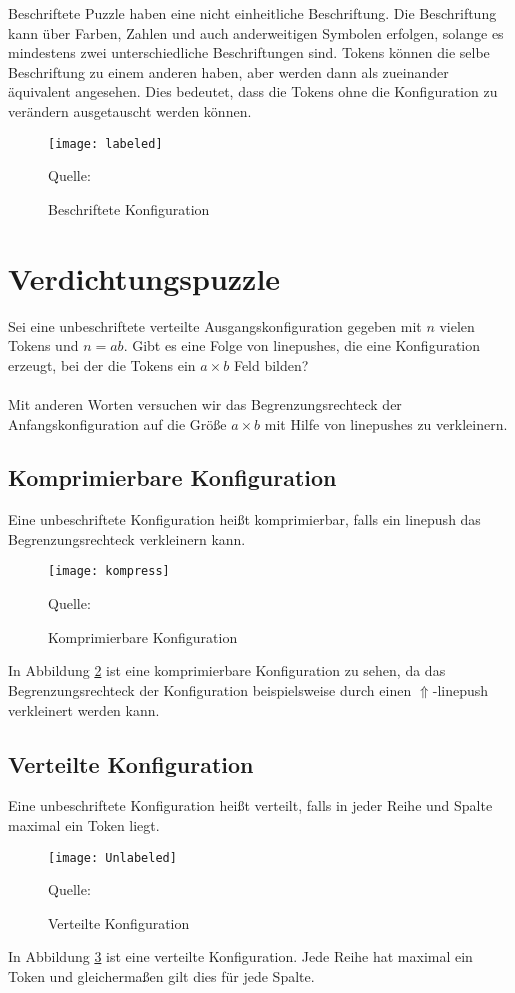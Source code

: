 \documentclass[seminar,german]{algothesis}
\newcommand*{\quelle}{%
  \footnotesize Quelle:
}
\begin{document}
\noindent
Beschriftete Puzzle haben eine nicht einheitliche Beschriftung. Die Beschriftung kann über Farben, Zahlen und auch anderweitigen Symbolen erfolgen, solange es mindestens zwei unterschiedliche Beschriftungen sind. Tokens können die selbe Beschriftung zu einem anderen haben, aber werden dann als zueinander äquivalent angesehen. Dies bedeutet, dass die Tokens ohne die Konfiguration zu verändern ausgetauscht werden können. 
\begin{figure}[ht]
	\centering
	\texttt{[image: labeled]}
	\caption{Beschriftete Konfiguration}
	\quelle \cite{akitaya2022pushing}
	\label{fig:7}
\end{figure}

\section{Verdichtungspuzzle}
Sei eine unbeschriftete verteilte Ausgangskonfiguration gegeben mit $n$ vielen Tokens und $n=ab$. Gibt es eine Folge von linepushes, die eine Konfiguration erzeugt, bei der die Tokens ein $a\times b$ Feld bilden? \\\\
Mit anderen Worten versuchen wir das Begrenzungsrechteck der Anfangskonfiguration auf die Größe $a\times b$ mit Hilfe von linepushes zu verkleinern.

\subsection{Komprimierbare Konfiguration}
\begin{definition}
Eine unbeschriftete Konfiguration heißt komprimierbar, falls ein linepush das Begrenzungsrechteck verkleinern kann.
\end{definition}
\begin{figure}[ht]
	\centering
	\texttt{[image: kompress]}
	\caption{Komprimierbare Konfiguration}
	\quelle \cite{akitaya2022pushing}
	\label{fig:8}
\end{figure}

\noindent In Abbildung \ref{fig:8} ist eine komprimierbare Konfiguration zu sehen, da das Begrenzungsrechteck der Konfiguration beispielsweise durch einen $\Uparrow$-linepush verkleinert werden kann.

\subsection{Verteilte Konfiguration}
\begin{definition}
Eine unbeschriftete Konfiguration heißt verteilt, falls in jeder Reihe und Spalte maximal ein Token liegt.
\end{definition}
\begin{figure}[ht]
	\centering
	\texttt{[image: Unlabeled]}
	\caption{Verteilte Konfiguration}
	\quelle \cite{akitaya2022pushing}
	\label{fig:9}
\end{figure}
\noindent In Abbildung \ref{fig:9} ist eine verteilte Konfiguration. Jede Reihe hat maximal ein Token und gleichermaßen gilt dies für jede Spalte.
\end{document}
